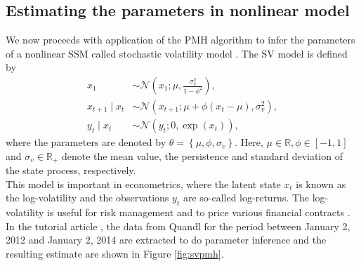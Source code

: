 \documentclass[mstat,12pt]{unswthesis}  %
\numberwithin{equation}{section}
\begin{document}
\subsection{Estimating the parameters in nonlinear model}
We now  proceeds with application of the PMH algorithm to infer the parameters of a nonlinear SSM called stochastic volatility model \cite{hull1987pricing}. 
The  SV model is defined  by
\begin{equation}\label{sv_model}
\begin{aligned}
x_{1} & \sim \mathcal{N}\left(x_{1} ; \mu, \frac{\sigma_{v}^{2}}{1-\phi^{2}}\right), \\
x_{t+1} \mid x_{t} & \sim \mathcal{N}\left(x_{t+1} ; \mu+\phi\left(x_{t}-\mu\right), \sigma_{v}^{2}\right), \\
y_{t} \mid x_{t} & \sim \mathcal{N}\left(y_{t} ; 0, \exp \left(x_{t}\right)\right),
\end{aligned}\end{equation}
where the parameters are denoted by $\theta=\left\{\mu, \phi, \sigma_{v}\right\}$. Here, $\mu \in \mathbb{R}, \phi \in[-1,1]$ and $\sigma_{v} \in  \mathbb{R}_{+}$
denote the mean value, the persistence and standard deviation of the state process,
respectively.\\

\noindent This model is important in econometrics, where  the latent state $x_{t}$ is known as the log-volatility and the observations $y_{t}$ are so-called log-returns. The log-volatility is useful for risk management and to price various financial contracts \cite{hull2009options}.\\

\noindent In the tutorial article \cite{dahlin2019getting},
the data
from Quandl for the period between January 2, 2012 and January 2, 2014 are extracted to do parameter inference
and the  resulting estimate are shown in Figure \ref{fig:svpmh}.
\end{document}
